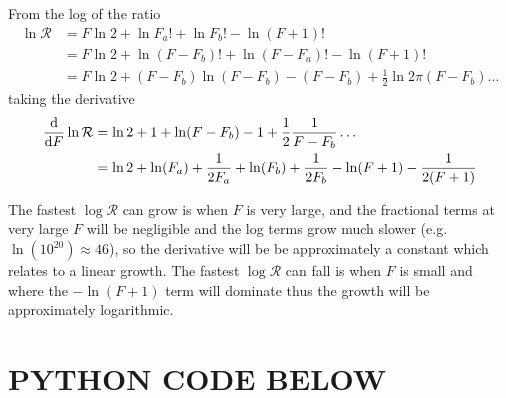 \documentclass[../main.tex]{subfiles}
\begin{document}
From the log of the ratio
\begin{align*}
    \ln \mathcal{R} &= F \ln 2 + \ln F_a! + \ln F_b! - \ln (F + 1)! \\
    &= F \ln 2 + \ln (F - F_b)! + \ln (F - F_a)! - \ln (F + 1)! \\
    &= F \ln 2 + (F - F_b) \ln (F - F_b) - (F - F_b) + \frac{1}{2} \ln 2\pi(F - F_b)\dots
\end{align*}
taking the derivative
\begin{align*}
    \dv{F} \ln \mathcal{R} &= \ln 2 + 1 + \ln (F - F_b) - 1 + \frac{1}{2} \frac{1}{F - F_b}\dots \\
    &= \ln 2 + \ln (F_a) + \frac{1}{2 F_a} + \ln (F_b) + \frac{1}{2 F_b}
        - \ln (F + 1) - \frac{1}{2 (F + 1)} 
\end{align*}

The fastest $\log \mathcal{R}$ can grow is when $F$ is very large, and the fractional terms at very
large $F$ will be negligible and the log terms grow much slower (e.g. $\ln(10^{20}) \approx 46$),
so the derivative will be be approximately a constant which relates to a linear growth.
The fastest $\log \mathcal{R}$ can fall is when $F$ is small and where the $-\ln(F + 1)$ term will
dominate thus the growth will be approximately logarithmic.


\newpage
\section*{PYTHON CODE BELOW}


\end{document}
